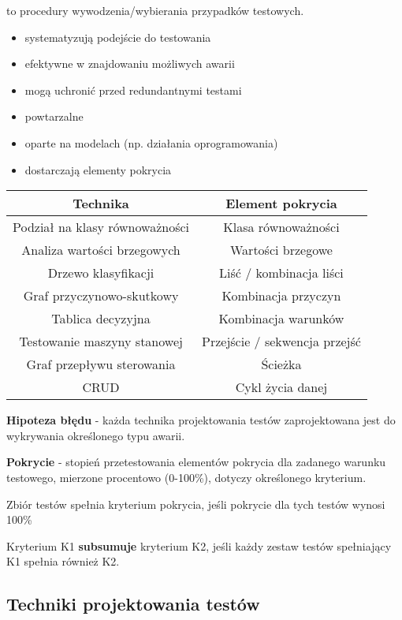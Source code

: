 \documentclass[../main.tex]{subfiles}
\begin{document}
    to procedury wywodzenia/wybierania przypadków testowych.
    \begin{itemize}
        \item systematyzują podejście do testowania
        \item efektywne w znajdowaniu możliwych awarii
        \item mogą uchronić przed redundantnymi testami
        \item powtarzalne
        \item oparte na modelach (np. działania oprogramowania)
        \item dostarczają elementy pokrycia
    \end{itemize}

    \begin{tabular}{|c|c|}
        \hline
        \textbf{Technika} & \textbf{Element pokrycia}\\
        \hline
        Podział na klasy równoważności & Klasa równoważności\\
        \hline
        Analiza wartości brzegowych & Wartości brzegowe\\
        \hline
        Drzewo klasyfikacji & Liść / kombinacja liści\\
        \hline
        Graf przyczynowo-skutkowy & Kombinacja przyczyn\\
        \hline
        Tablica decyzyjna & Kombinacja warunków\\
        \hline
        Testowanie maszyny stanowej & Przejście / sekwencja przejść\\
        \hline
        Graf przepływu sterowania & Ścieżka\\
        \hline
        CRUD & Cykl życia danej\\
        \hline
    \end{tabular}

    \textbf{Hipoteza błędu} - każda technika projektowania testów zaprojektowana jest do
    wykrywania określonego typu awarii.

    \textbf{Pokrycie} - stopień przetestowania elementów pokrycia dla zadanego
    warunku testowego, mierzone procentowo (0-100\%), dotyczy określonego kryterium.

    Zbiór testów spełnia kryterium pokrycia, jeśli pokrycie dla tych testów
    wynosi 100\%

    Kryterium K1 \textbf{subsumuje} kryterium K2, jeśli każdy zestaw testów
    spełniający K1 spełnia również K2.


    \subsection{Techniki projektowania testów}
\end{document}
